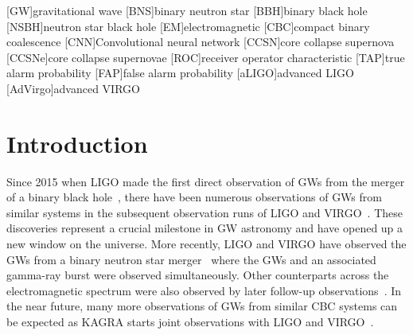 \documentclass[aps,twocolumn,showpacs,groupedaddress, nofootinbib]{revtex4}  %
\begin{document}
\pacs{}
\maketitle
{}[GW]{gravitational wave}
[BNS]{binary neutron star}
[BBH]{binary black hole}
[NSBH]{neutron star black hole}
[EM]{electromagnetic}
[CBC]{compact binary coalescence}
[CNN]{Convolutional neural network}
[CCSN]{core collapse supernova}
[CCSNe]{core collapse supernovae}
[ROC]{receiver operator characteristic}
[TAP]{true alarm probability}
[FAP]{false alarm probability}
[aLIGO]{advanced LIGO}
[AdVirgo]{advanced VIRGO}

\section{Introduction}
%
%
Since 2015 when LIGO made the first direct observation of \acp{GW} from the
merger of a binary black hole~\cite{abbott2016observation}, there have been
numerous observations of \acp{GW} from similar systems in the subsequent
observation runs of LIGO and VIRGO~\cite{abbott2016gw151226,
abbott2017gw170608, abbott2017gw170814}. These discoveries represent a crucial
milestone in \ac{GW} astronomy and have opened up a new window on the universe.
More recently, LIGO and VIRGO have observed the \acp{GW} from a binary neutron
star merger~\cite{abbott2017gw170817, abbott2017gravitational, abbott2017multi}
where the \acp{GW} and an associated gamma-ray burst were observed
simultaneously. Other counterparts across the electromagnetic spectrum were
also observed by later follow-up observations~\cite{abbott2017multi}. In the
near future, many more observations of \acp{GW} from similar \ac{CBC} systems
can be expected as KAGRA starts joint observations with LIGO and
VIRGO~\cite{aso2013interferometer, somiya2012detector, abbott2018prospects}.
\end{document}
